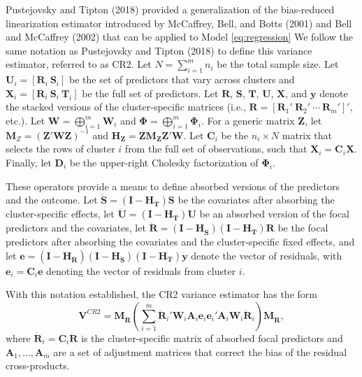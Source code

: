 \documentclass[12pt]{article}
\begin{document}
Pustejovsky and Tipton (2018) provided a generalization of the
bias-reduced linearization estimator introduced by McCaffrey, Bell, and
Botts (2001) and Bell and McCaffrey (2002) that can be applied to Model
\ref{eq:regression} We follow the same notation as Pustejovsky and
Tipton (2018) to define this variance estimator, referred to as CR2. Let
\(N = \sum_{i=1}^m n_i\) be the total sample size. Let
\(\mathbf{U}_i = \left[ \mathbf{R}_i \ \mathbf{S}_i \right]\) be the set
of predictors that vary across clusters and
\(\mathbf{X}_i = \left[ \mathbf{R}_i \ \mathbf{S}_i \ \mathbf{T}_i \right]\)
be the full set of predictors. Let \(\mathbf{R}\), \(\mathbf{S}\),
\(\mathbf{T}\), \(\mathbf{U}\), \(\mathbf{X}\), and \(\mathbf{y}\)
denote the stacked versions of the cluster-specific matrices (i.e.,
\(\mathbf{R} = \left[\mathbf{R}_1' \ \mathbf{R}_2' \ \cdots \ \mathbf{R}_m'\right]'\),
etc.). Let \(\mathbf{W} = \bigoplus_{i=1}^m \mathbf{W}_i\) and
\(\boldsymbol\Phi = \bigoplus_{i=1}^m \boldsymbol\Phi_i\). For a generic
matrix \(\mathbf{Z}\), let
\(\mathbf{M}_{Z} = \left(\mathbf{Z}'\mathbf{W}\mathbf{Z}\right)^{-1}\)
and
\(\mathbf{H}_{\mathbf{Z}} = \mathbf{Z} \mathbf{M}_{\mathbf{Z}}\mathbf{Z}'\mathbf{W}\).
Let \(\mathbf{C}_i\) be the \(n_i \times N\) matrix that selects the
rows of cluster \(i\) from the full set of observations, such that
\(\mathbf{X}_i = \mathbf{C}_i \mathbf{X}\). Finally, let
\(\mathbf{D}_i\) be the upper-right Cholesky factorization of
\(\mathbf{\Phi}_i\).

These operators provide a means to define absorbed versions of the
predictors and the outcome. Let
\(\mathbf{\ddot{S}} = \left(\mathbf{I} - \mathbf{H}_{\mathbf{T}}\right) \mathbf{S}\)
be the covariates after absorbing the cluster-specific effects, let
\(\mathbf{\ddot{U}} = \left(\mathbf{I} - \mathbf{H}_{\mathbf{T}}\right) \mathbf{U}\)
be an absorbed version of the focal predictors and the covariates, let
\(\mathbf{\ddot{R}} = \left(\mathbf{I} - \mathbf{H}_{\mathbf{\ddot{S}}}\right)\left(\mathbf{I} - \mathbf{H}_{\mathbf{T}}\right) \mathbf{R}\)
be the focal predictors after absorbing the covariates and the
cluster-specific fixed effects, and let
\(\mathbf{e} = \left(\mathbf{I} - \mathbf{H}_{\mathbf{\ddot{R}}}\right)\left(\mathbf{I} - \mathbf{H}_{\mathbf{\ddot{S}}}\right)\left(\mathbf{I} - \mathbf{H}_{\mathbf{T}}\right) \mathbf{y}\)
denote the vector of residuals, with
\(\mathbf{e}_i = \mathbf{C}_i\mathbf{e}\) denoting the vector of
residuals from cluster \(i\).

With this notation established, the CR2 variance estimator has the form
\begin{equation}
\mathbf{V}^{CR2} = \mathbf{M}_{\mathbf{\ddot{R}}} \left(\sum_{i=1}^m \mathbf{\ddot{R}}_i' \mathbf{W}_i \mathbf{A}_i \mathbf{e}_i \mathbf{e}_i' \mathbf{A}_i \mathbf{W}_i \mathbf{\ddot{R}}_i \right) \mathbf{M}_{\mathbf{\ddot{R}}},
\end{equation} where
\(\mathbf{\ddot{R}}_i = \mathbf{C}_i \mathbf{\ddot{R}}\) is the
cluster-specific matrix of absorbed focal predictors and
\(\mathbf{A}_1,...,\mathbf{A}_m\) are a set of adjustment matrices that
correct the bias of the residual cross-products.
\end{document}
